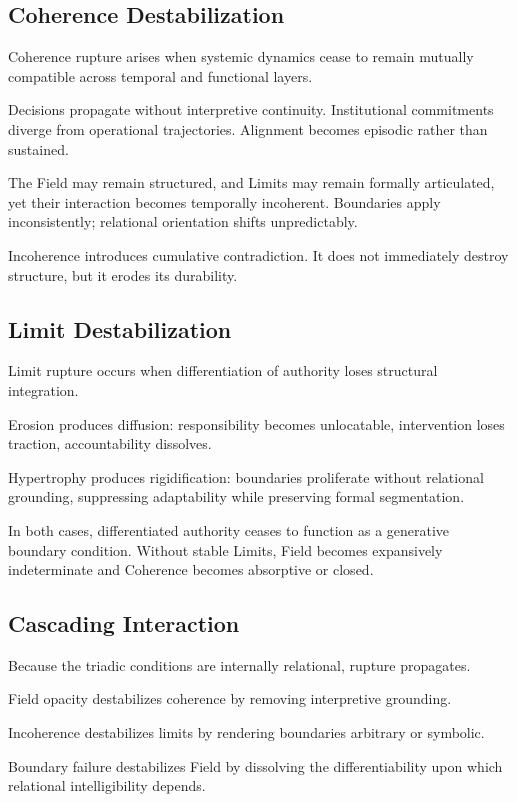 \documentclass[12pt]{article}
\begin{document}
\subsection{Coherence Destabilization}


Coherence rupture arises when systemic dynamics cease to remain mutually compatible across temporal and functional layers.

Decisions propagate without interpretive continuity. Institutional commitments diverge from operational trajectories. Alignment becomes episodic rather than sustained.

The Field may remain structured, and Limits may remain formally articulated, yet their interaction becomes temporally incoherent. Boundaries apply inconsistently; relational orientation shifts unpredictably.

Incoherence introduces cumulative contradiction. It does not immediately destroy structure, but it erodes its durability.

\subsection{Limit Destabilization}


Limit rupture occurs when differentiation of authority loses structural integration.

Erosion produces diffusion: responsibility becomes unlocatable, intervention loses traction, accountability dissolves.

Hypertrophy produces rigidification: boundaries proliferate without relational grounding, suppressing adaptability while preserving formal segmentation.

In both cases, differentiated authority ceases to function as a generative boundary condition. Without stable Limits, Field becomes expansively indeterminate and Coherence becomes absorptive or closed.

\subsection{Cascading Interaction}


Because the triadic conditions are internally relational, rupture propagates.

Field opacity destabilizes coherence by removing interpretive grounding.

Incoherence destabilizes limits by rendering boundaries arbitrary or symbolic.

Boundary failure destabilizes Field by dissolving the differentiability upon which relational intelligibility depends.
\end{document}
